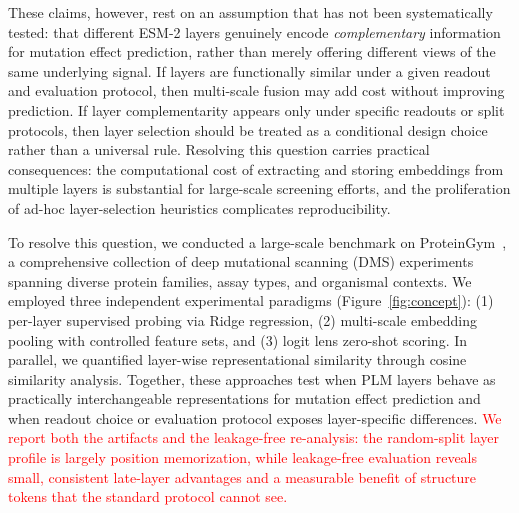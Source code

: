 \documentclass[numbered,webpdf,modern,large]{oup-authoring-template}
\newcommand{\rev}[1]{\textcolor{red}{#1}}
\begin{document}
These claims, however, rest on an assumption that has not been systematically tested:
that different ESM-2 layers genuinely encode \emph{complementary} information for
mutation effect prediction, rather than merely offering different views of the same
underlying signal. If layers are functionally similar under a given readout and
evaluation protocol, then multi-scale fusion may add cost without improving prediction.
If layer complementarity appears only under specific readouts or split protocols,
then layer selection should be treated as a conditional design choice rather than
a universal rule. Resolving this question carries practical
consequences: the computational cost of extracting and storing embeddings from
multiple layers is substantial for large-scale screening efforts, and the
proliferation of ad-hoc layer-selection heuristics complicates reproducibility.

To resolve this question, we conducted a large-scale benchmark on ProteinGym~\cite{notin2024proteingym},
a comprehensive collection of deep mutational scanning (DMS) experiments spanning
diverse protein families, assay types, and organismal contexts. We employed
three independent experimental paradigms (Figure~\ref{fig:concept}): (1) per-layer supervised probing via Ridge
regression, (2) multi-scale embedding pooling with controlled feature sets, and
(3) logit lens zero-shot scoring. In parallel, we quantified layer-wise representational
similarity through cosine similarity analysis. Together, these approaches test when
PLM layers behave as practically interchangeable representations for mutation effect
prediction and when readout choice or evaluation protocol exposes layer-specific
differences. \rev{We report both the artifacts and the leakage-free re-analysis:
the random-split layer profile is largely position memorization, while leakage-free
evaluation reveals small, consistent late-layer advantages and a measurable benefit of
structure tokens that the standard protocol cannot see.}
\end{document}
